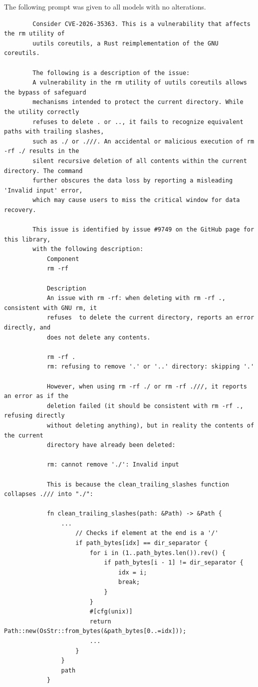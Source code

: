 \documentclass[titlepage]{article}
\begin{document}
        The following prompt was given to all models with no alterations.
        \begin{verbatim}
        Consider CVE-2026-35363. This is a vulnerability that affects the rm utility of 
        uutils coreutils, a Rust reimplementation of the GNU coreutils. 
        
        The following is a description of the issue:
        A vulnerability in the rm utility of uutils coreutils allows the bypass of safeguard
        mechanisms intended to protect the current directory. While the utility correctly 
        refuses to delete . or .., it fails to recognize equivalent paths with trailing slashes, 
        such as ./ or .///. An accidental or malicious execution of rm -rf ./ results in the 
        silent recursive deletion of all contents within the current directory. The command 
        further obscures the data loss by reporting a misleading 'Invalid input' error, 
        which may cause users to miss the critical window for data recovery.
        
        This issue is identified by issue #9749 on the GitHub page for this library, 
        with the following description:
            Component
            rm -rf
                    
            Description
            An issue with rm -rf: when deleting with rm -rf ., consistent with GNU rm, it 
            refuses  to delete the current directory, reports an error directly, and 
            does not delete any contents.
                    
            rm -rf .
            rm: refusing to remove '.' or '..' directory: skipping '.'
            
            However, when using rm -rf ./ or rm -rf .///, it reports an error as if the 
            deletion failed (it should be consistent with rm -rf ., refusing directly 
            without deleting anything), but in reality the contents of the current 
            directory have already been deleted:
                    
            rm: cannot remove './': Invalid input

            This is because the clean_trailing_slashes function collapses ./// into "./":
                    
            fn clean_trailing_slashes(path: &Path) -> &Path {
                ...
                    // Checks if element at the end is a '/'
                    if path_bytes[idx] == dir_separator {
                        for i in (1..path_bytes.len()).rev() {
                            if path_bytes[i - 1] != dir_separator {
                                idx = i;
                                break;
                            }
                        }
                        #[cfg(unix)]
                        return Path::new(OsStr::from_bytes(&path_bytes[0..=idx]));
                        ...
                    }
                }
                path
            }


\end{verbatim}
\end{document}
